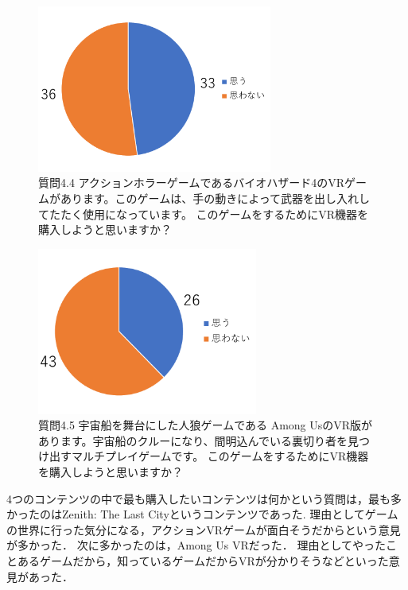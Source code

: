 \documentclass[12pt,a4j]{ltjsarticle}
\begin{document}
\begin{figure}[h]
\begin{center}
 \includegraphics[clip,height=55mm]{
 アンケート2_4_4.pdf}
\end{center}
 \caption{質問4.4 アクションホラーゲームであるバイオハザード4のVRゲームがあります。このゲームは、手の動きによって武器を出し入れしてたたく使用になっています。
このゲームをするためにVR機器を購入しようと思いますか？}
 \label{fig:アンケート2_4_4.pdf}
\end{figure}

\begin{figure}[h]
\begin{center}
 \includegraphics[clip,height=55mm]{
 アンケート2_4_5.pdf}
\end{center}
 \caption{質問4.5 宇宙船を舞台にした人狼ゲームである Among UsのVR版があります。宇宙船のクルーになり、間明込んでいる裏切り者を見つけ出すマルチプレイゲームです。
このゲームをするためにVR機器を購入しようと思いますか？}
 \label{fig:アンケート2_4_5.pdf}
\end{figure}

4つのコンテンツの中で最も購入したいコンテンツは何かという質問は，最も多かったのはZenith: The Last Cityというコンテンツであった.
理由としてゲームの世界に行った気分になる，アクションVRゲームが面白そうだからという意見が多かった．
次に多かったのは，Among Us VRだった．
理由としてやったことあるゲームだから，知っているゲームだからVRが分かりそうなどといった意見があった．
\end{document}
